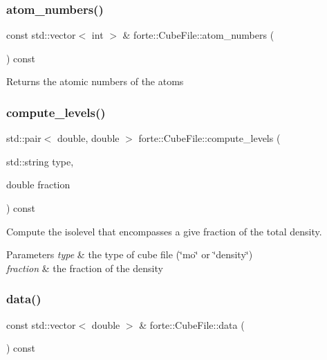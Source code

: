 \subsubsection{\texorpdfstring{atom\+\_\+numbers()}{atom\_numbers()}}
{\footnotesize\ttfamily const std\+::vector$<$ int $>$ \& forte\+::\+Cube\+File\+::atom\+\_\+numbers (\begin{DoxyParamCaption}{ }\end{DoxyParamCaption}) const}

\begin{DoxyReturn}{Returns}
the atomic numbers of the atoms 
\end{DoxyReturn}
\mbox{\label{classforte_1_1_cube_file_ae645bcad6dbc72a471f032e436bd21ae}} 
\subsubsection{\texorpdfstring{compute\+\_\+levels()}{compute\_levels()}}
{\footnotesize\ttfamily std\+::pair$<$ double, double $>$ forte\+::\+Cube\+File\+::compute\+\_\+levels (\begin{DoxyParamCaption}\item[{std\+::string}]{type,  }\item[{double}]{fraction }\end{DoxyParamCaption}) const}



Compute the isolevel that encompasses a give fraction of the total density. 


\begin{DoxyParams}{Parameters}
{\em type} & the type of cube file (\char`\"{}mo\char`\"{} or \char`\"{}density\char`\"{}) \\
\hline
{\em fraction} & the fraction of the density \\
\hline
\end{DoxyParams}
\mbox{\label{classforte_1_1_cube_file_ac3de35bae3f81d684ce53aced0486e28}} 
\subsubsection{\texorpdfstring{data()}{data()}}
{\footnotesize\ttfamily const std\+::vector$<$ double $>$ \& forte\+::\+Cube\+File\+::data (\begin{DoxyParamCaption}{ }\end{DoxyParamCaption}) const}

